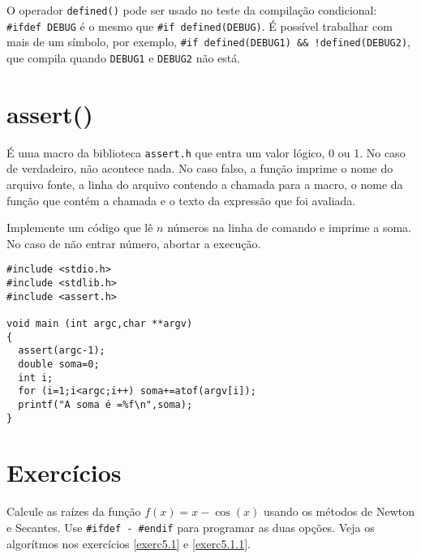 O operador \verb|defined()| pode ser usado no teste da compilação condicional: \verb|#ifdef DEBUG| é o mesmo que \verb|#if defined(DEBUG)|. É possível trabalhar com mais de um símbolo, por exemplo, \verb|#if defined(DEBUG1) && !defined(DEBUG2)|, que compila quando \verb|DEBUG1| e \verb|DEBUG2| não está.

\section{assert()}
É uma macro da biblioteca \verb|assert.h| que entra um valor lógico, 0 ou 1. No caso de verdadeiro, não acontece nada. No caso falso, a função imprime o nome do arquivo fonte, a linha do arquivo contendo a chamada para a macro, o nome da função que contém a chamada e o texto da expressão que foi avaliada.
\begin{ex}
Implemente um código que lê $n$ números na linha de comando e imprime a soma. No caso de não entrar número, abortar a execução.
\end{ex}
\begin{verbatim}
#include <stdio.h>
#include <stdlib.h>
#include <assert.h>

void main (int argc,char **argv)
{
  assert(argc-1);
  double soma=0;
  int i;
  for (i=1;i<argc;i++) soma+=atof(argv[i]);
  printf("A soma é =%f\n",soma);
}
\end{verbatim}

\section{Exercícios}
\begin{exer}Calcule as raízes da função
$f(x)=x-\cos(x)$
usando os métodos de Newton e Secantes. Use \verb|#ifdef - #endif| para programar as duas opções. Veja os algorítmos nos exercícios \ref{exerc5.1} e \ref{exerc5.1.1}.
\end{exer}